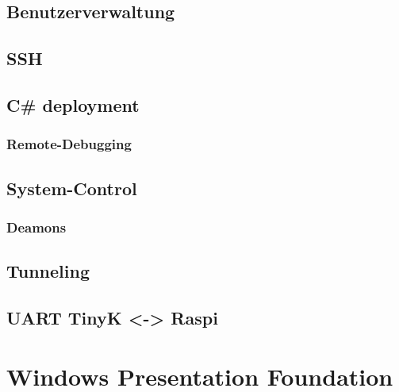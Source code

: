 \documentclass[
  9pt,
  a4paperpaper,
  DIV=11]{scrartcl}
\numberwithin{equation}{section}
\begin{document}
\begin{multicols}{2}
{\subsection{Benutzerverwaltung}\label{benutzerverwaltung}}

\hypertarget{ssh}{%
\subsection{SSH}\label{ssh}}

\hypertarget{c-deployment}{%
\subsection{C\# deployment}\label{c-deployment}}

\hypertarget{remote-debugging}{%
\subsubsection{Remote-Debugging}\label{remote-debugging}}

\hypertarget{system-control}{%
\subsection{System-Control}\label{system-control}}

\hypertarget{deamons}{%
\subsubsection{Deamons}\label{deamons}}

\hypertarget{tunneling}{%
\subsection{Tunneling}\label{tunneling}}

\hypertarget{uart-tinyk---raspi}{%
\subsection{UART TinyK \textless-\textgreater{}
Raspi}\label{uart-tinyk---raspi}}

\hypertarget{windows-presentation-foundation}{%
\section{\texorpdfstring{\textbf{W}indows \textbf{P}resentation
\textbf{F}oundation}{Windows Presentation Foundation}}\label{windows-presentation-foundation}}


\end{multicols}
\end{document}
